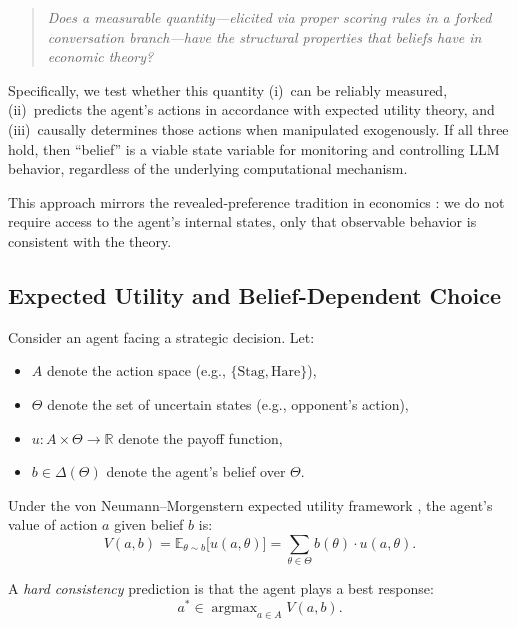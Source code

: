 \documentclass[12pt]{article}
\newcommand{\E}{\mathbb{E}}
\newcommand{\R}{\mathbb{R}}
\newcommand{\argmax}{\operatorname{argmax}}
\begin{document}
\begin{quote}
\emph{Does a measurable quantity---elicited via proper scoring rules in a forked conversation branch---have the structural properties that beliefs have in economic theory?}
\end{quote}

Specifically, we test whether this quantity (i)~can be reliably measured, (ii)~predicts the agent's actions in accordance with expected utility theory, and (iii)~causally determines those actions when manipulated exogenously. If all three hold, then ``belief'' is a viable state variable for monitoring and controlling LLM behavior, regardless of the underlying computational mechanism.

This approach mirrors the revealed-preference tradition in economics \citep{samuelson1938note}: we do not require access to the agent's internal states, only that observable behavior is consistent with the theory.

\subsection{Expected Utility and Belief-Dependent Choice}
\label{sec:eu_theory}

Consider an agent facing a strategic decision. Let:
\begin{itemize}[nosep]
    \item $A$ denote the action space (e.g., $\{\text{Stag}, \text{Hare}\}$),
    \item $\Theta$ denote the set of uncertain states (e.g., opponent's action),
    \item $u: A \times \Theta \to \R$ denote the payoff function,
    \item $b \in \Delta(\Theta)$ denote the agent's belief over $\Theta$.
\end{itemize}

Under the von Neumann--Morgenstern expected utility framework \citep{vonneumann1947theory}, the agent's value of action $a$ given belief $b$ is:
\begin{equation}
    V(a, b) = \E_{\theta \sim b}\big[u(a, \theta)\big] = \sum_{\theta \in \Theta} b(\theta) \cdot u(a, \theta).
    \label{eq:expected_value}
\end{equation}

A \emph{hard consistency} prediction is that the agent plays a best response:
\begin{equation}
    a^* \in \argmax_{a \in A} V(a, b).
    \label{eq:hard_consistency}
\end{equation}
\end{document}
